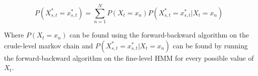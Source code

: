 $$P(X^*_{s,t} = x^*_{s,t}) = \sum_{n=1}^N P(X_t = x_n)P(X^*_{s,t} = x^*_{s,t} | X_t = x_n)$$

Where $P(X_t = x_n)$ can be found using the forward-backward algorithm on the crude-level markov chain and $P(X^*_{s,t} = x^*_{s,t} | X_t = x_n)$ can be found by running the forward-backward algorithm on the fine-level HMM for every possible value of $X_t$.



